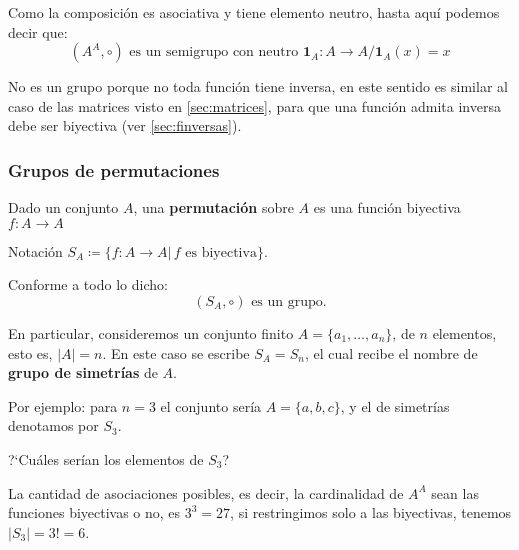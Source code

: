 Como la composición es asociativa y tiene elemento neutro, hasta aquí podemos decir que:
\[ (A^A, \circ) \mbox{ es un semigrupo con neutro } \mathbf{1}_A: A \rightarrow A /  \mathbf{1}_A(x) = x \]

No es un grupo porque no toda función tiene inversa, en este sentido es similar al caso de las matrices visto en \ref{sec:matrices}, para que una función admita inversa debe ser biyectiva (ver \ref{sec:finversas}). 

\subsubsection{Grupos de permutaciones}
\begin{fmd-definition}[Permutación]
	Dado un conjunto $A$, una \textbf{permutación} sobre $A$ es una función biyectiva $f: A \rightarrow A$
\end{fmd-definition}

Notación $S_A \coloneqq \{ f: A \rightarrow A | \, f \mbox{ es biyectiva}\}$.

Conforme a todo lo dicho:
\[ (S_A, \circ ) \mbox{ es un grupo.}\]

En particular, consideremos un conjunto finito $A = \{ a_1, \dots, a_n \}$, de $n$ elementos, esto es, $|A| = n$. En este caso se escribe $S_A = S_n$, el cual recibe el nombre de \textbf{grupo de simetrías} de $A$.

Por ejemplo: para $n = 3$ el conjunto sería $A = \{a, b, c\}$, y el de simetrías denotamos por $S_3$.

?`Cuáles serían los elementos de $S_3$?

La cantidad de asociaciones posibles, es decir, la cardinalidad de $A^A$ sean las funciones biyectivas o no, es $3^3 = 27$, si restringimos solo a las biyectivas, tenemos $|S_3| = 3! = 6$.

